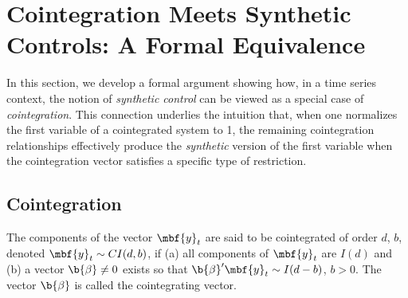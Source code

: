 \section{Cointegration Meets Synthetic Controls: A Formal Equivalence}
\label{sec:cointegration_synthetic_controls}

In this section, we develop a formal argument showing how, in a time series context, the notion of \emph{synthetic control} can be viewed as a special case of \emph{cointegration}. This connection underlies the intuition that, when one normalizes the first variable of a cointegrated system to 1, the remaining cointegration relationships effectively produce the \emph{synthetic} version of the first variable when the cointegration vector satisfies a specific type of restriction. 

\subsection{Cointegration}


\begin{definition}
The components of the vector $\mbf{y}_t$ are said to be cointegrated of order $d$, $b$, denoted $\mbf{y}_t \sim CI(d,b)$, if (a) all components of $\mbf{y}_t$ are $I(d)$ and (b) a vector $\b{\beta}\neq 0$ exists so that $\b{\beta}'\mbf{y}_t \sim I(d-b)$, $b > 0$. The vector $\b{\beta}$ is called the cointegrating vector.
\end{definition}

